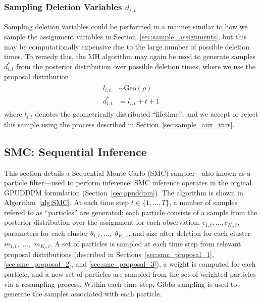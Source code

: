 \documentclass[twocolumn, final]{svjour3}
\begin{document}

\subsubsection{Sampling Deletion Variables $d_{i,t}$}
Sampling deletion variables could be performed in a manner similar to how we sample the assignment variables in Section~\ref{sec:sample_assignments}, but this may be computationally expensive due to the large number of possible deletion times. To remedy this, the MH algorithm may again be used to generate samples $d_{i,t}^{*}$ from the posterior distribution over possible deletion times, where we use the proposal distribution
\begin{align}
\begin{split}
l_{i,t}  &\sim  \text{Geo}(\rho)  \\
d_{i,t}^{*}  &= l_{i,t} + t + 1
\end{split}
\end{align}
where $l_{i,t}$ denotes the geometrically distributed ``lifetime'', and we accept or reject this sample using the process described in Section~\ref{sec:sample_aux_vars}.


\subsection{SMC: Sequential Inference}
\label{sec:SMC}

This section details a Sequential Monte Carlo (SMC) sampler---also known as a particle filter---used to perform inference. SMC inference operates in the orginal GPUDDPM formulation (Section~\ref{sec:gpuddpm}). The algorithm is shown in Algorithm~\ref{alg:SMC}. At each time step $t \in \{ 1, \ldots, T \}$, a number of samples refered to as ``particles'' are generated; each particle consists of a sample from the posterior distribution over the assignment for each observation, $c_{1,t}, \ldots, c_{N_{t}, t}$, parameters for each cluster $\theta_{1,t}, \ldots,$ $\theta_{K_{t}, t}$, and size after deletion for each cluster $m_{1,t},$ $\ldots,$ $m_{K_{t},t}$. A set of particles is sampled at each time step from relevant proposal distributions (described in Sections~\ref{sec:smc_proposal_1}, \ref{sec:smc_proposal_2}, and \ref{sec:smc_proposal_3}), a weight is computed for each particle, and a new set of particles are sampled from the set of weighted particles via a resampling process. Within each time step, Gibbs sampling is used to generate the samples associated with each particle.
\end{document}

